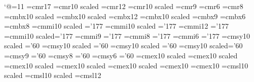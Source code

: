 %
\catcode`@=11 %
%
%
%
\font\seventeenrm=cmr17
\font\fourteenrm=cmr10 scaled
\font\twelverm=cmr12
\font\elvrm=cmr10 scaled\magstephalf
\font\ninerm=cmr9            \font\sixrm=cmr6
\font\egtrm=cmr8
%
\font\seventeenbf=cmbx10 scaled
\font\fourteenbf=cmbx10 scaled
\font\twelvebf=cmbx12
\font\elvbf=cmbx10 scaled\magstephalf
\font\ninebf=cmbx9            \font\sixbf=cmbx6
\font\egtbf=cmbx8
%
\font\seventeeni=cmmi10 scaled     \skewchar\seventeeni='177
\font\fourteeni=cmmi10 scaled      \skewchar\fourteeni='177
\font\twelvei=cmmi12                        \skewchar\twelvei='177
\font\elvi=cmmi10 scaled\magstephalf     \skewchar\elvi='177
\font\ninei=cmmi9                           \skewchar\ninei='177
\font\egti=cmmi8                           \skewchar\egti='177
\font\sixi=cmmi6                            \skewchar\sixi='177
%
\font\seventeensy=cmsy10 scaled    \skewchar\seventeensy='60
\font\fourteensy=cmsy10 scaled     \skewchar\fourteensy='60
\font\twelvesy=cmsy10 scaled       \skewchar\twelvesy='60
\font\elvsy=cmsy10 scaled\magstephalf    \skewchar\elvsy='60
\font\ninesy=cmsy9                          \skewchar\ninesy='60
\font\egtsy=cmsy8                          \skewchar\egtsy='60
\font\sixsy=cmsy6                           \skewchar\sixsy='60
%
\font\seventeenex=cmex10 scaled
\font\fourteenex=cmex10 scaled
\font\twelveex=cmex10 scaled
\font\elevenex=cmex10 scaled\magstephalf
\font\elvex=cmex10 scaled\magstephalf
\font\ninex=cmex10
\font\egtex=cmex10
%
\font\seventeensl=cmsl10 scaled
\font\fourteensl=cmsl10 scaled
\font\twelvesl=cmsl12
